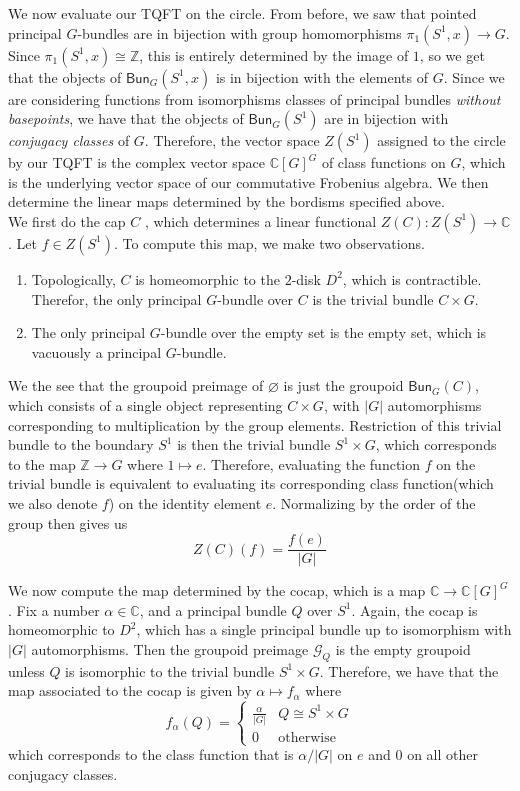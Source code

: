 \documentclass[psamsfonts, 11pt]{amsart}
\theoremstyle{definition}
\theoremstyle{remark}
\renewcommand{\emptyset}{\varnothing}
\newcommand{\Z}{\mathbb{Z}}
\newcommand{\C}{\mathbb{C}}
\newcommand{\Bun}{\mathsf{Bun}}
\begin{document}
We now evaluate our TQFT on the circle. From before, we saw that pointed principal
$G$-bundles are in bijection with group homomorphisms $\pi_1(S^1,x) \to G$. Since
$\pi_1(S^1, x) \cong \Z$, this is entirely determined by the image of $1$, so we
get that the objects of $\Bun_G(S^1, x)$ is in bijection with the elements of $G$.
Since we are  considering functions from isomorphisms classes of principal bundles
\emph{without basepoints}, we have that the objects of $\Bun_G(S^1)$ are in bijection
with \emph{conjugacy classes} of $G$. Therefore, the vector space
$Z(S^1)$ assigned to the circle by our TQFT is the complex vector space
$\C[G]^G$ of class functions on $G$, which is the underlying vector space of our
commutative Frobenius algebra. We then determine the linear maps determined
by the bordisms specified above. \\

We first do the cap $C$ , which determines a linear functional
$Z(C) : Z(S^1) \to \C$. Let $f \in Z(S^1)$. To compute this map, we make two
observations.
%
\begin{enumerate}
  \item Topologically, $C$ is homeomorphic to the $2$-disk $D^2$, which is contractible.
  Therefor, the only principal $G$-bundle over $C$ is the trivial bundle $C \times G$.
  \item The only principal $G$-bundle over the empty set is the empty set, which
  is vacuously a principal $G$-bundle.
\end{enumerate}
%
We the see that the groupoid preimage of $\emptyset$ is just the groupoid
$\Bun_G(C)$, which consists of a single object representing $C \times G$, with
$|G|$ automorphisms corresponding to multiplication by the group elements. Restriction
of this trivial bundle to the boundary $S^1$ is then the trivial bundle $S^1 \times G$,
which corresponds to the map $\Z \to G$ where $1 \mapsto e$. Therefore, evaluating
the function $f$ on the trivial bundle is equivalent to evaluating its corresponding
class function(which we also denote $f$) on the identity element $e$.
Normalizing by the order of the group then gives us
\[
Z(C)(f) = \frac{f(e)}{|G|}
\]

We now compute the map determined by the cocap, which is a map $\C \to \C[G]^G$.
Fix a number $\alpha \in \C$, and a principal bundle $Q$ over $S^1$. Again, the cocap
is homeomorphic to $D^2$, which has a single principal bundle up to isomorphism with
$|G|$ automorphisms. Then the groupoid preimage $\mathcal{G}_Q$ is the empty
groupoid unless $Q$ is isomorphic to the trivial bundle $S^1 \times G$. Therefore,
we have that the map associated to the cocap is given by $\alpha \mapsto f_\alpha$
where
\[
f_\alpha(Q) = \begin{cases}
\frac{\alpha}{|G|} & Q \cong S^1 \times G \\
0 & \text{otherwise}
\end{cases}
\]
which corresponds to the class function that is $\alpha/|G|$ on $e$ and $0$ on all
other conjugacy classes. \\
\end{document}
